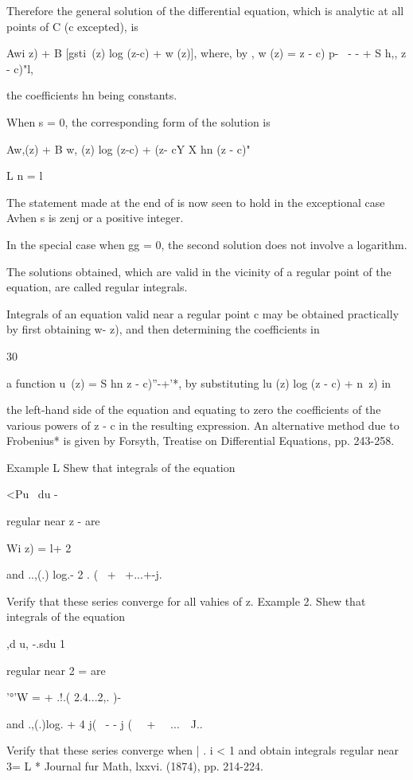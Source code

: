 %
%

Therefore the general solution of the differential equation, which is
analytic at all points of C (c excepted), is

Awi z) + B [gsti\ (z) log (z-c) + w (z)], where, by , w (z) = z
- c) p- \ - - + S h,, z - c)"l,

the coefficients hn being constants.

When s = 0, the corresponding form of the solution is

Aw,(z) + B w, (z) log (z-c) + (z- cY X hn (z - c)"

L n = l \

The statement made at the end of  is now seen to hold in the
exceptional case Avhen s is zenj or a positive integer.

In the special case when gg = 0, the second solution does not involve
a logarithm.

The solutions obtained, which are valid in the vicinity of a regular
point of the equation, are called regular integrals.

Integrals of an equation valid near a regular point c may be obtained
practically by first obtaining w- z), and then determining the
coefficients in

30

a function u\ (z) = S hn z - c)''-+'*, by substituting lu (z) log (z -
c) + n\ z) in

the left-hand side of the equation and equating to zero the
coefficients of the various powers of z - c in the resulting
expression. An alternative method due to Frobenius* is given by
Forsyth, Treatise on Differential Equations, pp. 243-258.

Example L Shew that integrals of the equation

<Pu \ du -

regular near z - are

Wi z) = l+ 2

and ..,(.) log.- 2 . ( \ + \ +...+-j.

Verify that these series converge for all vahies of z. Example 2. Shew
that integrals of the equation

,d u, -.sdu 1

regular near 2 = are

'°'W = + .!.( 2.4...2,. )-

and .,(.)log. + 4 j( \ - - j ( \ \ + \ \ ...\ \ J..

Verify that these series converge when | . i < 1 and obtain integrals
regular near 3= L * Journal fur Math, lxxvi. (1874), pp. 214-224.

